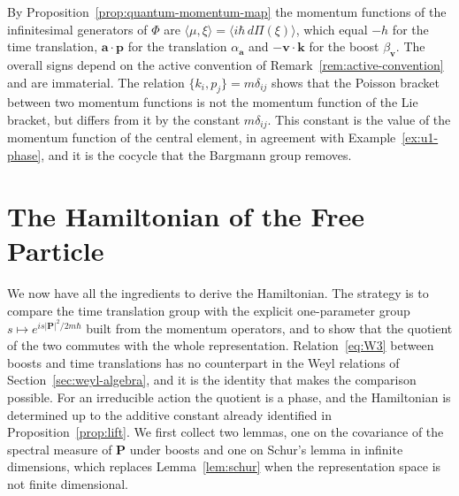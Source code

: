 \begin{remark}\label{rem:momentum-map}
	By Proposition~\ref{prop:quantum-momentum-map} the momentum functions of the infinitesimal generators of $\Phi$ are $\langle\mu,\xi\rangle=\langle i\hbar\,d\Pi(\xi)\rangle$, which equal $-h$ for the time translation, $\mathbf{a}\cdot\mathbf{p}$ for the translation $\alpha_{\mathbf{a}}$ and $-\mathbf{v}\cdot\mathbf{k}$ for the boost $\beta_{\mathbf{v}}$. The overall signs depend on the active convention of Remark~\ref{rem:active-convention} and are immaterial. The relation $\{k_i,p_j\}=m\delta_{ij}$ shows that the Poisson bracket between two momentum functions is not the momentum function of the Lie bracket, but differs from it by the constant $m\delta_{ij}$. This constant is the value of the momentum function of the central element, in agreement with Example~\ref{ex:u1-phase}, and it is the cocycle that the Bargmann group removes.
\end{remark}

\section{The Hamiltonian of the Free Particle}
\label{sec:free-hamiltonian}

We now have all the ingredients to derive the Hamiltonian. The strategy is to compare the time translation group with the explicit one-parameter group $s\mapsto e^{is|\mathbf{P}|^2/2m\hbar}$ built from the momentum operators, and to show that the quotient of the two commutes with the whole representation. Relation~\eqref{eq:W3} between boosts and time translations has no counterpart in the Weyl relations of Section~\ref{sec:weyl-algebra}, and it is the identity that makes the comparison possible. For an irreducible action the quotient is a phase, and the Hamiltonian is determined up to the additive constant already identified in Proposition~\ref{prop:lift}. We first collect two lemmas, one on the covariance of the spectral measure of $\mathbf{P}$ under boosts and one on Schur's lemma in infinite dimensions, which replaces Lemma~\ref{lem:schur} when the representation space is not finite dimensional.

